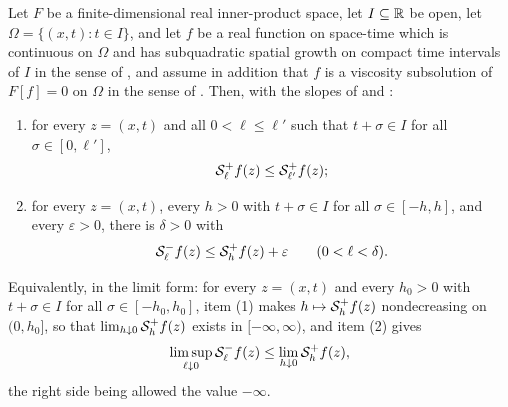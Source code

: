 \begin{lemma}
Let $F$ be a finite-dimensional real inner-product space, let $I\subseteq\mathbb{R}$ be
open, let $\Omega=\{(x,t):t\in I\}$, and let $f$ be a real function on space-time
which is continuous on $\Omega$ and has subquadratic spatial growth on compact
time intervals of $I$ in the sense of ,
and assume in addition that $f$ is a viscosity subsolution of $F[f]=0$ on $\Omega$ in the
sense of . Then, with the slopes of 
and :
\begin{enumerate}
\item for every $z=(x,t)$ and all $0<\ell\le\ell'$ such that $t+\sigma\in I$ for
all $\sigma\in[0,\ell']$,
\[
  \mathcal{S}_\ell^+f(z)\le\mathcal{S}_{\ell'}^+f(z);
\]
\item for every $z=(x,t)$, every $h>0$ with $t+\sigma\in I$ for all
$\sigma\in[-h,h]$, and every $\varepsilon>0$, there is $\delta>0$ with
\[
  \mathcal{S}_\ell^-f(z)\le\mathcal{S}_h^+f(z)+\varepsilon\qquad(0<\ell<\delta).
\]
\end{enumerate}
Equivalently, in the limit form: for every $z=(x,t)$ and every $h_0>0$ with
$t+\sigma\in I$ for all $\sigma\in[-h_0,h_0]$, item (1) makes
$h\mapsto\mathcal{S}_h^+f(z)$ nondecreasing on $(0,h_0]$, so that
$\lim_{h\downarrow0}\mathcal{S}_h^+f(z)$ exists in $[-\infty,\infty)$, and item (2)
gives
\begin{equation}\label{eq:subsolution-slope-order}
  \limsup_{\ell\downarrow0}\mathcal{S}_\ell^-f(z)
       \le\lim_{h\downarrow0}\mathcal{S}_h^+f(z),
\end{equation}
the right side being allowed the value $-\infty$.
\end{lemma}
